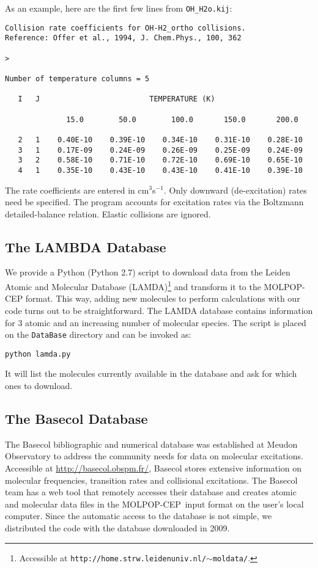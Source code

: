 \documentclass[12pt]{article}
\def\M{MOLPOP-CEP}
\begin{document}
As an example, here are the first few lines from \texttt{OH\_H2o.kij}:
\begin{verbatim}
Collision rate coefficients for OH-H2_ortho collisions.
Reference: Offer et al., 1994, J. Chem.Phys., 100, 362

>

Number of temperature columns = 5

   I   J                         TEMPERATURE (K)

              15.0        50.0        100.0       150.0       200.0

   2   1    0.40E-10    0.39E-10    0.34E-10    0.31E-10    0.28E-10
   3   1    0.17E-09    0.24E-09    0.26E-09    0.25E-09    0.24E-09
   3   2    0.58E-10    0.71E-10    0.72E-10    0.69E-10    0.65E-10
   4   1    0.35E-10    0.43E-10    0.43E-10    0.41E-10    0.39E-10
\end{verbatim}
The rate coefficients are entered in cm$^3$s$^{-1}$.  Only downward
(de-excitation) rates need be specified. The program accounts for excitation
rates via the Boltzmann detailed-balance relation. Elastic collisions are
ignored.

\subsection{The LAMBDA Database}
We provide a Python (Python 2.7) script to download data from the Leiden Atomic and Molecular Database (LAMDA)\footnote{Accessible at \texttt{http://home.strw.leidenuniv.nl/$\sim$moldata/}.}
and transform it to the MOLPOP-CEP format. This way, adding new molecules to perform calculations with 
our code turns out to be straightforward. The LAMDA database contains information for 3 atomic and an increasing number of molecular species. The
script is placed on the \texttt{DataBase} directory and can be invoked as:
\begin{verbatim}
python lamda.py
\end{verbatim}
It will list the molecules currently available in the database and ask for which ones to download.

\subsection{The Basecol Database}
The Basecol bibliographic and numerical database was established at Meudon
Observatory to address the community needs for data on molecular excitations.
Accessible at \url{http://basecol.obspm.fr/}, Basecol stores extensive
information on molecular frequencies, transition rates and collisional
excitations. The Basecol team has a web tool
that remotely accesses their database and creates atomic and molecular data
files in the \M\ input format on the user's local computer. Since the automatic
access to the database is not simple, we distributed the code with the
database downloaded in 2009.
\end{document}
